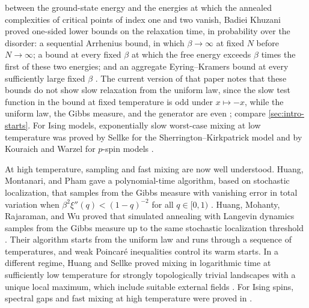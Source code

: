 between the ground-state energy and the energies at which the annealed complexities of critical points of index one and two vanish, Badiei Khuzani proved one-sided lower bounds on the relaxation time, in probability over the disorder: a sequential Arrhenius bound, in which $\beta\to\infty$ at fixed $N$ before $N\to\infty$; a bound at every fixed $\beta$ at which the free energy exceeds $\beta$ times the first of these two energies; and an aggregate Eyring--Kramers bound at every sufficiently large fixed $\beta$ \cite[Definition~1 and Theorems~8--10]{BadieiKhuzani2026}. The current version of that paper notes that these bounds do not show slow relaxation from the uniform law, since the slow test function in the bound at fixed temperature is odd under $x\mapsto-x$, while the uniform law, the Gibbs measure, and the generator are even \cite[Section~4.3]{BadieiKhuzani2026}; compare \cref{sec:intro-starts}. For Ising models, exponentially slow worst-case mixing at low temperature was proved by Sellke for the Sherrington--Kirkpatrick model \cite{Sellke2025} and by Kouraich and Warzel for $p$-spin models \cite{KouraichWarzel2026}.

At high temperature, sampling and fast mixing are now well understood. Huang, Montanari, and Pham gave a polynomial-time algorithm, based on stochastic localization, that samples from the Gibbs measure with vanishing error in total variation when $\beta^2\xi''(q)<(1-q)^{-2}$ for all $q\in[0,1)$ \cite{HuangMontanariPham2024}. Huang, Mohanty, Rajaraman, and Wu proved that simulated annealing with Langevin dynamics samples from the Gibbs measure up to the same stochastic localization threshold \cite{HuangMohantyRajaramanWu2025}. Their algorithm starts from the uniform law and runs through a sequence of temperatures, and weak Poincar\'e inequalities control its warm starts. In a different regime, Huang and Sellke proved mixing in logarithmic time at sufficiently low temperature for strongly topologically trivial landscapes with a unique local maximum, which include suitable external fields \cite{HuangSellke2026}. For Ising spins, spectral gaps and fast mixing at high temperature were proved in \cite{BauerschmidtBodineau2019,EldanKoehlerZeitouni2022,AdhikariBrenneckeXuYau2024,AnariJainKoehlerPhamVuong2024}.

